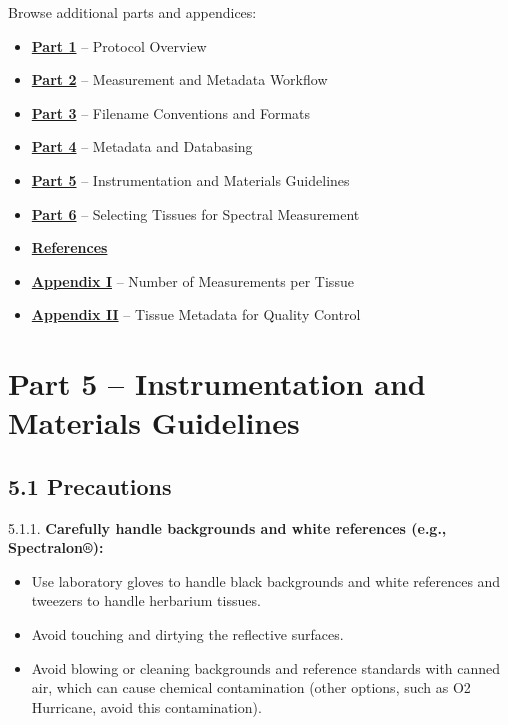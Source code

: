 \documentclass[
  letterpaper,
  DIV=11,
  numbers=noendperiod]{scrreprt}
\providecommand{\tightlist}{%
  \setlength{\itemsep}{0pt}\setlength{\parskip}{0pt}}
\begin{document}
Browse additional parts and appendices:

\begin{itemize}
\tightlist
\item
  \hyperref[part1]{\textbf{Part 1}} -- Protocol Overview
\item
  \hyperref[part2]{\textbf{Part 2}} -- Measurement and Metadata Workflow
\item
  \hyperref[part3]{\textbf{Part 3}} -- Filename Conventions and Formats
\item
  \hyperref[part4]{\textbf{Part 4}} -- Metadata and Databasing
\item
  \hyperref[part5]{\textbf{Part 5}} -- Instrumentation and Materials
  Guidelines
\item
  \hyperref[part6]{\textbf{Part 6}} -- Selecting Tissues for Spectral
  Measurement
\item
  \hyperref[references]{\textbf{References}}
\item
  \hyperref[app1]{\textbf{Appendix I}} -- Number of Measurements per
  Tissue
\item
  \hyperref[app2]{\textbf{Appendix II}} -- Tissue Metadata for Quality
  Control
\end{itemize}


\chapter{Part 5 -- Instrumentation and Materials
Guidelines}\label{part-5-instrumentation-and-materials-guidelines}

\section{5.1 Precautions}\label{part5}

5.1.1. \textbf{Carefully handle backgrounds and white references (e.g.,
Spectralon®):}

\begin{itemize}
\tightlist
\item
  Use laboratory gloves to handle black backgrounds and white references
  and tweezers to handle herbarium tissues.\\
\item
  Avoid touching and dirtying the reflective surfaces.\\
\item
  Avoid blowing or cleaning backgrounds and reference standards with
  canned air, which can cause chemical contamination (other options,
  such as O2 Hurricane, avoid this contamination).
\end{itemize}
\end{document}

